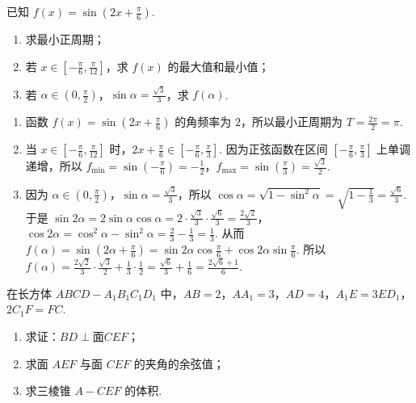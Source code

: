 \documentclass[UTF8,a4paper,oneside,11pt]{ctexbook}
\begin{document}
\begin{problem}
已知 \(f(x)=\sin \left( 2x+\frac{\pi}{6} \right)\).

\begin{enumerate}
\item 求最小正周期；
\item 若 \(x\in \left[ -\frac{\pi}{6},\frac{\pi}{12} \right]\)，求 \(f(x)\) 的最大值和最小值；
\item 若 \(\alpha\in \left( 0,\frac{\pi}{2} \right)\)，\(\sin \alpha=\frac{\sqrt{3}}{3}\)，求 \(f(\alpha)\).
\end{enumerate}
\end{problem}

\begin{solution}
\begin{enumerate}
\item 函数 \(f(x)=\sin \left( 2x+\frac{\pi}{6} \right)\) 的角频率为 \(2\)，所以最小正周期为 \(T=\frac{2\pi}{2}=\pi\).

\item 当 \(x\in \left[ -\frac{\pi}{6},\frac{\pi}{12} \right]\) 时，\(2x+\frac{\pi}{6}\in \left[ -\frac{\pi}{6},\frac{\pi}{3} \right]\). 因为正弦函数在区间 \(\left[ -\frac{\pi}{6},\frac{\pi}{3} \right]\) 上单调递增，所以 \(f_{\min}=\sin \left( -\frac{\pi}{6} \right)=-\frac{1}{2}\)，\(f_{\max}=\sin \left( \frac{\pi}{3} \right)=\frac{\sqrt{3}}{2}\).

\item 因为 \(\alpha\in \left( 0,\frac{\pi}{2} \right)\)，\(\sin \alpha=\frac{\sqrt{3}}{3}\)，所以 \(\cos \alpha=\sqrt{1-\sin^2 \alpha}=\sqrt{1-\frac{1}{3}}=\frac{\sqrt{6}}{3}\). 于是 \(\sin 2\alpha=2\sin \alpha \cos \alpha=2\cdot \frac{\sqrt{3}}{3}\cdot \frac{\sqrt{6}}{3}=\frac{2\sqrt{2}}{3}\)，\(\cos 2\alpha=\cos^2 \alpha-\sin^2 \alpha=\frac{2}{3}-\frac{1}{3}=\frac{1}{3}\). 从而 \(f(\alpha)=\sin \left( 2\alpha+\frac{\pi}{6} \right)=\sin 2\alpha \cos \frac{\pi}{6}+\cos 2\alpha \sin \frac{\pi}{6}\). 所以 \(f(\alpha)=\frac{2\sqrt{2}}{3}\cdot \frac{\sqrt{3}}{2}+\frac{1}{3}\cdot \frac{1}{2}=\frac{\sqrt{6}}{3}+\frac{1}{6}=\frac{2\sqrt{6}+1}{6}\).
\end{enumerate}
\end{solution}

\begin{problem}
在长方体 \(ABCD-A_1B_1C_1D_1\) 中，\(AB=2\)，\(AA_1=3\)，\(AD=4\)，\(A_1E=3ED_1\)，\(2C_1F=FC\).

\begin{enumerate}
\item 求证：\(BD\perp \text{面} CEF\)；
\item 求面 \(AEF\) 与面 \(CEF\) 的夹角的余弦值；
\item 求三棱锥 \(A-CEF\) 的体积.
\end{enumerate}

\end{problem}
\end{document}
